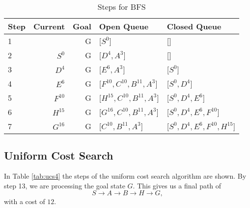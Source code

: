 \documentclass{article}
\begin{document}
    \begin{table}[!htp]\centering
        \caption{Steps for BFS}\label{tab:dfs4}
        \scriptsize
        \begin{tabular}{lrrll}\toprule
        Step &Current&Goal& Open Queue &Closed Queue  \\\midrule
        1&  &G &[$S^0$] &[] \\
        2& $S^0$ &G &[$D^4, A^3$] &[] \\
        3& $D^4$ &G &[$E^6, A^3$] &[$S^0$] \\
        4& $E^6$ &G &[$F^{10}, C^{10}, B^{11}, A^3$] &[$S^0, D^4$] \\
        5& $F^{10}$ &G &[$H^{15},C^{10}, B^{11}, A^3$] &[$S^0, D^4, E^{6}$] \\
        6& $H^{15}$ &G &[$G^{16},C^{10}, B^{11}, A^3$] &[$S^0, D^4, E^{6}, F^{10}$] \\
        7& $G^{16}$ &G &[$C^{10}, B^{11}, A^3$] &[$S^0, D^4, E^{6}, F^{10}, H^{15}$] \\

        \end{tabular}
    \end{table}




\subsection{Uniform Cost Search}

    In Table \ref{tab:ucs4} the steps of the uniform cost search algorithm are shown. 
    By step 13, we are processing the goal state $G$. This gives us a final path of
    \begin{equation}
        S \rightarrow A \rightarrow B \rightarrow H \rightarrow G,
    \end{equation}
    with a cost of $12$.
\end{document}
